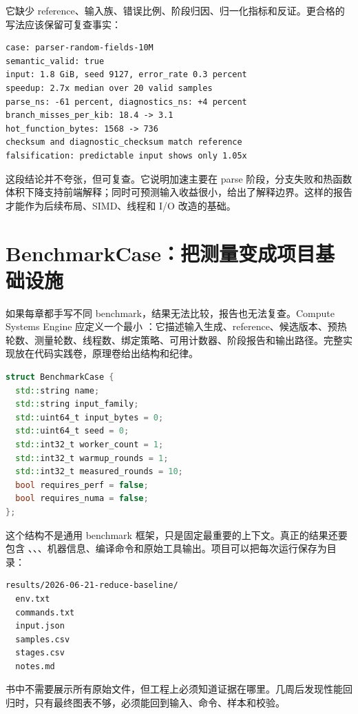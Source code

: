 它缺少 reference、输入族、错误比例、阶段归因、归一化指标和反证。更合格的写法应该保留可复查事实：

\begin{lstlisting}[numbers=none,caption={可复查的性能结论}]
case: parser-random-fields-10M
semantic_valid: true
input: 1.8 GiB, seed 9127, error_rate 0.3 percent
speedup: 2.7x median over 20 valid samples
parse_ns: -61 percent, diagnostics_ns: +4 percent
branch_misses_per_kib: 18.4 -> 3.1
hot_function_bytes: 1568 -> 736
checksum and diagnostic_checksum match reference
falsification: predictable input shows only 1.05x
\end{lstlisting}

这段结论并不夸张，但可复查。它说明加速主要在 parse 阶段，分支失败和热函数体积下降支持前端解释；同时可预测输入收益很小，给出了解释边界。这样的报告才能作为后续布局、SIMD、线程和 I/O 改造的基础。

\section{BenchmarkCase：把测量变成项目基础设施}

如果每章都手写不同 benchmark，结果无法比较，报告也无法复查。Compute Systems Engine 应定义一个最小 ：它描述输入生成、reference、候选版本、预热轮数、测量轮数、线程数、绑定策略、可用计数器、阶段报告和输出路径。完整实现放在代码实践卷，原理卷给出结构和纪律。

\begin{lstlisting}[language=C++,caption={BenchmarkCase 的最小形态}]
struct BenchmarkCase {
  std::string name;
  std::string input_family;
  std::uint64_t input_bytes = 0;
  std::uint64_t seed = 0;
  std::int32_t worker_count = 1;
  std::int32_t warmup_rounds = 1;
  std::int32_t measured_rounds = 10;
  bool requires_perf = false;
  bool requires_numa = false;
};
\end{lstlisting}

这个结构不是通用 benchmark 框架，只是固定最重要的上下文。真正的结果还要包含 、、、机器信息、编译命令和原始工具输出。项目可以把每次运行保存为目录：

\begin{lstlisting}[language={},caption={一次实验归档目录的建议形态}]
results/2026-06-21-reduce-baseline/
  env.txt
  commands.txt
  input.json
  samples.csv
  stages.csv
  notes.md
\end{lstlisting}

书中不需要展示所有原始文件，但工程上必须知道证据在哪里。几周后发现性能回归时，只有最终图表不够，必须能回到输入、命令、样本和校验。

